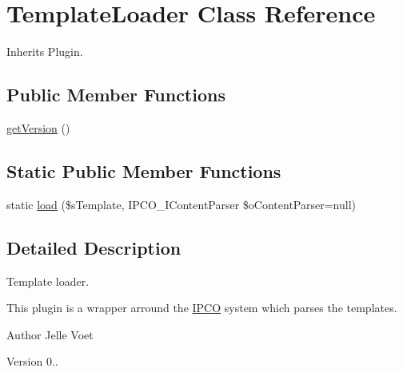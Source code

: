 \hypertarget{class_template_loader}{\section{Template\-Loader Class Reference}
\label{class_template_loader}
}


Inherits Plugin.

\subsection*{Public Member Functions}
\begin{DoxyCompactItemize}
\item 
\hyperlink{class_template_loader_addcf3877964626b7166e2bb9f538bac6}{get\-Version} ()
\end{DoxyCompactItemize}
\subsection*{Static Public Member Functions}
\begin{DoxyCompactItemize}
\item 
static \hyperlink{class_template_loader_a703dbe2d24cc3173f2f5a9b52a3d53e8}{load} (\$s\-Template, I\-P\-C\-O\-\_\-\-I\-Content\-Parser \$o\-Content\-Parser=null)
\end{DoxyCompactItemize}


\subsection{Detailed Description}
Template loader.

This plugin is a wrapper arround the \hyperlink{class_i_p_c_o}{I\-P\-C\-O} system which parses the templates.

\begin{DoxyAuthor}{Author}
Jelle Voet 
\end{DoxyAuthor}
\begin{DoxyVersion}{Version}
0.. 
\end{DoxyVersion}


